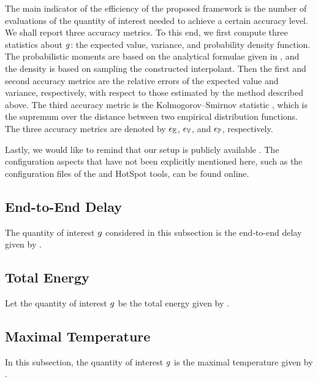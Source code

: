 The main indicator of the efficiency of the proposed framework is the number of
evaluations of the quantity of interest needed to achieve a certain accuracy
level. We shall report three accuracy metrics. To this end, we first compute
three statistics about $g$: the expected value, variance, and probability
density function. The probabilistic moments are based on the analytical formulae
given in , and the density is based on sampling the
constructed interpolant. Then the first and second accuracy metrics are the
relative errors of the expected value and variance, respectively, with respect
to those estimated by the  method described above. The third accuracy
metric is the Kolmogorov--Smirnov statistic \cite{rao2009}, which is the
supremum over the distance between two empirical distribution functions. The
three accuracy metrics are denoted by $\epsilon_\mathbb{E}$, $\epsilon_\mathbb{V}$, and $\epsilon_\mathbb{P}$,
respectively.

Lastly, we would like to remind that our setup is publicly available
\cite{sources}. The configuration aspects that have not been explicitly
mentioned here, such as the configuration files of the  and HotSpot
tools, can be found online.


\subsection{End-to-End Delay}
The quantity of interest $g$ considered in this subsection is the end-to-end
delay given by .

\subsection{Total Energy}
Let the quantity of interest $g$ be the total energy given by
.

\subsection{Maximal Temperature}
In this subsection, the quantity of interest $g$ is the maximal temperature
given by .
